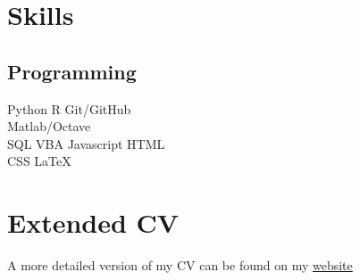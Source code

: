\documentclass[]{cv-template}
\begin{document}
\begin{minipage}[t]{0.33\textwidth}


\section{Skills}
\subsection{Programming}
Python \textbullet{} R \textbullet{} Git/GitHub \\
Matlab/Octave\\ 
SQL \textbullet{} VBA \textbullet{} Javascript \textbullet{} HTML \\
CSS \textbullet{} \LaTeX\
\sectionsep



\section{Extended CV}
A more detailed version of my CV can be found on my \href{http://www.jackgrimes.uk/bio/}{website}\\

%
%

\end{minipage} 
\hfill
\end{document}
